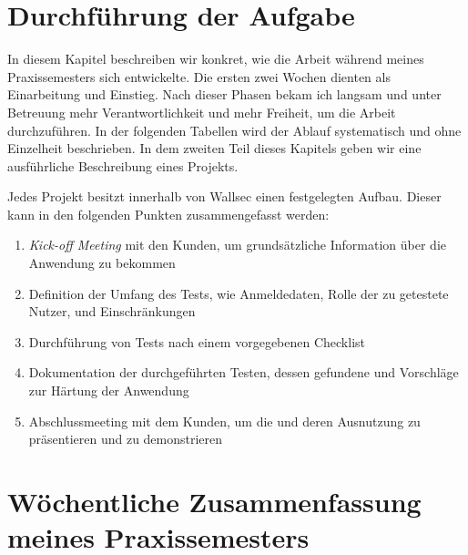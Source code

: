 \section{Durchführung der Aufgabe}

In diesem Kapitel beschreiben wir konkret, wie die Arbeit während meines Praxissemesters sich entwickelte. Die ersten zwei Wochen dienten als Einarbeitung und Einstieg. Nach dieser Phasen bekam ich langsam und unter Betreuung mehr Verantwortlichkeit und mehr Freiheit, um die Arbeit durchzuführen. In der folgenden Tabellen wird der Ablauf systematisch und ohne Einzelheit beschrieben. In dem zweiten Teil dieses Kapitels geben wir eine ausführliche Beschreibung eines Projekts.

Jedes Projekt besitzt innerhalb von Wallsec einen festgelegten Aufbau. Dieser kann in den folgenden Punkten zusammengefasst werden:

\begin{enumerate} \label{Projektablauf}
    \item \textit{Kick-off Meeting} mit den Kunden, um grundsätzliche Information über die Anwendung zu bekommen
    \item Definition der Umfang des Tests, wie Anmeldedaten, Rolle der zu getestete Nutzer,  und Einschränkungen
    \item Durchführung von Tests nach einem vorgegebenen Checklist
    \item Dokumentation der durchgeführten Testen, dessen gefundene  und Vorschläge zur Härtung der Anwendung
    \item Abschlussmeeting mit dem Kunden, um die  und deren Ausnutzung zu präsentieren und zu demonstrieren
\end{enumerate} 

\section{Wöchentliche Zusammenfassung meines Praxissemesters}

